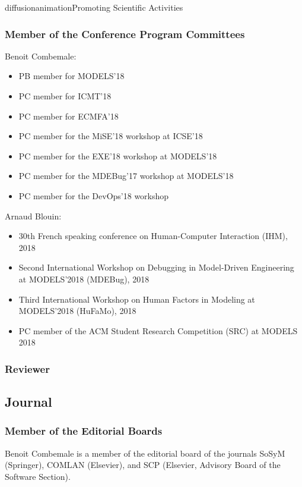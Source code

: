 \documentclass{ra2018}
\begin{document}
\begin{module}{diffusion}{animation}{Promoting Scientific Activities}
    \subsubsection{Member of the Conference Program Committees}
    
    Benoit Combemale: 
\begin{itemize}
	\item PB member for MODELS’18
	\item PC member for ICMT’18
	\item PC member for ECMFA’18
	\item PC member for the MiSE’18 workshop at ICSE’18
	\item PC member for the EXE’18 workshop at MODELS’18
         \item PC member for the MDEBug’17 workshop at MODELS’18
	\item PC member for the DevOps’18 workshop
\end{itemize} 

Arnaud Blouin:
\begin{itemize}
    \item 30th French speaking conference on Human-Computer Interaction (IHM), 2018
    \item Second International Workshop on Debugging in Model-Driven Engineering at MODELS'2018 (MDEBug), 2018
    \item Third International Workshop on Human Factors in Modeling at MODELS'2018 (HuFaMo), 2018
	\item PC member of the ACM Student Research Competition (SRC) at MODELS 2018
\end{itemize} 
    
    
    \subsubsection{Reviewer}

\subsection{Journal}
    \subsubsection{Member of the Editorial Boards}

Benoit Combemale is a member of the editorial board of the journals SoSyM (Springer), COMLAN (Elsevier), and SCP (Elsevier, Advisory Board of the Software Section).    
    

\end{module}
\end{document}
